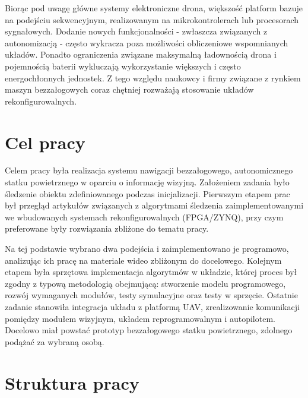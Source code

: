 Biorąc pod uwagę główne systemy elektroniczne drona, większość platform bazuje na podejściu sekwencyjnym, realizowanym na mikrokontrolerach lub procesorach sygnałowych. Dodanie nowych funkcjonalności - zwłaszcza związanych z autonomizacją - często wykracza poza możliwości obliczeniowe wspomnianych układów. Ponadto ograniczenia związane maksymalną ładownością drona i pojemnością baterii wykluczają wykorzystanie większych i często energochłonnych jednostek.  Z tego względu naukowcy i firmy związane z rynkiem maszyn bezzałogowych coraz chętniej rozważają stosowanie układów rekonfigurowalnych.


\section{Cel pracy}

Celem pracy była realizacja systemu nawigacji bezzałogowego, 
autonomicznego statku powietrznego w oparciu o informację wizyjną. 
Założeniem zadania było śledzenie obiektu zdefiniowanego podczas inicjalizacji. 
Pierwszym etapem prac był przegląd artykułów związanych z algorytmami śledzenia 
zaimplementowanymi we wbudowanych systemach rekonfigurowalnych 
(FPGA/ZYNQ), przy czym preferowane były rozwiązania zbliżone do tematu pracy. 

Na tej podstawie wybrano dwa podejścia i zaimplementowano je programowo, 
analizując ich pracę na materiale wideo zbliżonym do docelowego. 
Kolejnym etapem była sprzętowa implementacja algorytmów w układzie, 
której proces był zgodny z typową metodologią obejmującą: stworzenie modelu programowego, 
rozwój wymaganych modułów, testy symulacyjne oraz testy w sprzęcie.
Ostatnie zadanie stanowiła integracja układu z platformą UAV, 
zrealizowanie komunikacji pomiędzy modułem wizyjnym, 
układem reprogramowalnym i autopilotem. 
Docelowo miał powstać prototyp bezzałogowego statku powietrznego, zdolnego podążać za wybraną osobą.





\section{Struktura pracy}

